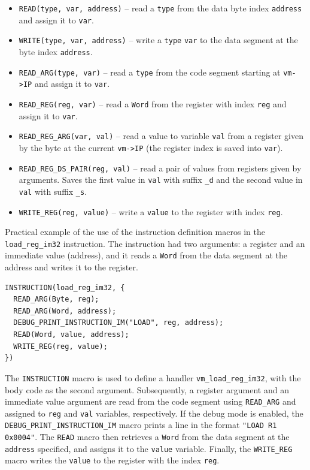 \documentclass[10pt,a4paper,final]{article}
\newcommand{\code}[1]{\texttt{#1}}
\begin{document}
\begin{itemize}
  \item \code{READ(type, var, address)} -- read a \code{type} from the data
    byte index \code{address} and assign it to \code{var}.
  \item \code{WRITE(type, var, address)} -- write a \code{type} \code{var} to
    the data segment at the byte index \code{address}.

  \item \code{READ_ARG(type, var)} -- read a \code{type} from the code segment
    starting at \code{vm->IP} and assign it to \code{var}.
  \item \code{READ_REG(reg, var)} -- read a \code{Word} from the register
    with index \code{reg} and assign it to \code{var}.
  \item \code{READ_REG_ARG(var, val)} -- read a value to variable \code{val}
    from a register given by the byte at the current \code{vm->IP} (the
    register index is saved into \code{var}).
  \item \code{READ_REG_DS_PAIR(reg, val)} -- read a pair of values from
    registers given by arguments. Saves the first value in \code{val} with
    suffix \code{_d} and the second value in \code{val} with suffix
    \code{_s}.
  \item \code{WRITE_REG(reg, value)} -- write a \code{value} to the register
    with index \code{reg}.
\end{itemize}

Practical example of the use of the instruction definition macros in the
\code{load_reg_im32} instruction. The instruction had two arguments: a register
and an immediate value (address), and it reads a \code{Word} from the data
segment at the address and writes it to the register.

\begin{verbatim}
INSTRUCTION(load_reg_im32, {
  READ_ARG(Byte, reg);
  READ_ARG(Word, address);
  DEBUG_PRINT_INSTRUCTION_IM("LOAD", reg, address);
  READ(Word, value, address);
  WRITE_REG(reg, value);
})
\end{verbatim}

The \code{INSTRUCTION} macro is used to define a handler
\code{vm_load_reg_im32}, with the body code as the second argument.
Subsequently, a register argument and an immediate value argument are read from
the code segment using \code{READ_ARG} and assigned to \code{reg} and \code{val}
variables, respectively. If the debug mode is enabled, the
\code{DEBUG_PRINT_INSTRUCTION_IM} macro prints a line in the format \code{"LOAD
R1 0x0004"}. The \code{READ} macro then retrieves a \code{Word} from the data
segment at the \code{address} specified, and assigns it to the \code{value}
variable. Finally, the \code{WRITE_REG} macro writes the \code{value} to the
register with the index \code{reg}.
\end{document}
